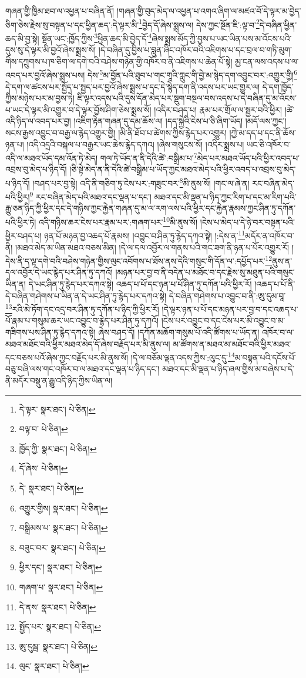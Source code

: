 གཞན་གྱི་ཁྱིམ་ཐབ་ལ་འཕྱན་པ་བཞིན་ནོ། །གཞན་གྱི་བུད་མེད་ལ་འཕྱན་པ་འགའ་ཞིག་ལ་མཛའ་བོ་དེ་ལྟར་མ་བྱེད་ཅིག་ཅེས་རྗེས་སུ་བསྟན་པ་དང་ཕྱིན་ཆད་:དེ་ལྟར་མི་\footnote{དེ་ལྟར་  སྣར་ཐང་།  པེ་ཅིན། }བྱེད་དོ་ཞེས་སྨྲས་ལ། དེས་ཀྱང་སྔོན་ཇི་:ལྟ་བ་\footnote{བལྟ་བ་  པེ་ཅིན། }དེ་བཞིན་ཕྱིན་ཆད་མི་བྱ་སྟེ། སྔོན་ཡང་:ཁྱོད་ཀྱིས་\footnote{ཁྱོད་ཀྱི་  སྣར་ཐང་།  པེ་ཅིན། }ཕྱིན་ཆད་མི་བྱེད་དོ་\footnote{དོ་ཞེས་  པེ་ཅིན། }ཞེས་སྨྲས་མོད་ཀྱི་བྱས་པ་ཡང་ཡིན་པས་མ་འོངས་པའི་དུས་སུ་དེ་ལྟར་མི་བྱའོ་ཞེས་སྨྲས་སོ། །དེ་བཞིན་དུ་བྱིས་པ་བླུན་ཞིང་འཁོར་བའི་འཇིགས་པ་དང་བྲལ་བ་གཏི་མུག་གིས་དཀྲུགས་པ་ཁ་ཅིག་ལ་དགེ་བའི་བཤེས་གཉེན་གྱི་འཁོར་བ་ནི་འཇིགས་པ་ཆེན་པོ་སྟེ། མྱ་ངན་ལས་འདས་པ་ལ་འབད་པར་བྱའོ་ཞེས་སྨྲས་པས། དེས་\footnote{དེ་  སྣར་ཐང་།  པེ་ཅིན། }མ་བྱོན་པའི་ཐུབ་པ་གང་གཱའི་ཀླུང་གི་བྱེ་མ་སྙེད་དག་འབྱུང་བར་:འགྱུར་གྱི།\footnote{འགྱུར་གྱིས།  སྣར་ཐང་།  པེ་ཅིན། } དེ་དག་ལ་ཚངས་པར་སྤྱོད་པ་སྤྱད་པར་བྱའོ་ཞེས་སྨྲས་པ་དང་དེ་སྙེད་དག་ནི་འདས་པར་ཡང་གྱུར་ལ། དེ་དག་ཁྱོད་ཀྱིས་མཉེས་པར་མ་བྱས་ཏེ། ཇི་ལྟར་འདས་པའི་དུས་དོན་མེད་པར་སྡུག་བསྔལ་བས་འདས་པ་དེ་བཞིན་དུ་མ་འོངས་པ་ཡང་དེ་ལྟར་མི་འགྱུར་བ་དེ་ལྟར་བྱོས་ཤིག་ཅེས་སྨྲས་སོ། །འདིར་བཤད་པ། རྣམ་པར་གྲོལ་ལ་སྦྱར་བའི་ཕྱིར། །ཚེ་འདི་ཉིད་ལ་འབད་པར་བྱ། །འཇིག་རྟེན་གཞན་དུ་དམ་ཆོས་ལ། །དད་སྐྱེའི་ངེས་པ་ཅི་ཞིག་ཡོད། །མདོ་ལས་ཀྱང་། སངས་རྒྱས་འབྱུང་བ་བརྒྱ་ལ་རྙེད་འགྱུར་གྱི། །མི་ནི་ཐོབ་པ་ཚེགས་ཀྱིས་རྙེད་པར་འགྱུར། །ཀྱེ་མ་དད་པ་དང་ནི་ཆོས་ཉན་པ། །འདི་འདྲའི་བསྐལ་པ་བརྒྱར་ཡང་ཆེས་རྙེད་དཀའ། །ཞེས་གསུངས་སོ། །འདིར་སྨྲས་པ། ཡང་ཅི་འཁོར་བ་འདི་ལ་མཐའ་ཡོད་དམ་འོན་ཏེ་མེད། གལ་ཏེ་ཡོད་ན་ནི་དེའི་ཚེ་:བསྒྲིམ་པ་\footnote{བསྒྲིམས་པ་  སྣར་ཐང་།  པེ་ཅིན། }མེད་པར་མཐའ་ཡོད་པའི་ཕྱིར་འབད་པ་འབྲས་བུ་མེད་པ་ཉིད་དོ། །ཅི་སྟེ་མེད་ན་ནི་དེའི་ཚེ་བསྒྲིམ་པ་ཡོད་ཀྱང་མཐའ་མེད་པའི་ཕྱིར་འབད་པ་འབྲས་བུ་མེད་པ་ཉིད་དོ། །བཤད་པར་བྱ་སྟེ། འདི་ནི་གཅིག་ཏུ་ངེས་པར་:གཟུང་བར་\footnote{བཟུང་བར་  སྣར་ཐང་།  པེ་ཅིན། }མི་ནུས་སོ། །གང་ལ་ཞེ་ན། རང་བཞིན་མེད་པའི་ཕྱིར།\footnote{ཕྱིར་དང་།  སྣར་ཐང་།  པེ་ཅིན། } རང་བཞིན་མེད་པའི་མཐའ་དང་ལྡན་པ་དང་། མཐའ་དང་མི་ལྡན་པ་ཉིད་ཀྱང་རིག་པ་དང་མ་རིག་པའི་རྒྱུ་ཅན་ཉིད་ཀྱི་ཕྱིར་དང་དེ་གཉིས་ཀྱང་རྐྱེན་གཞན་དུ་མ་ལ་རག་ལས་པའི་ཕྱིར་དང་རྐྱེན་རྣམས་ཀྱང་ཤིན་ཏུ་དཀོན་པའི་ཕྱིར་ཏེ། འདི་གཉིས་ཆར་ངེས་པར་རྣམ་པར་:གཞག་པར་\footnote{གཞག་པ་  སྣར་ཐང་།  པེ་ཅིན། }མི་ནུས་སོ། །ངེས་པ་མེད་པ་དེ་ཉེ་བར་བསྟན་པའི་ཕྱིར་བཤད་པ། ཉན་པོ་མཉན་བྱ་འཆད་པོ་རྣམས། །འབྱུང་བ་ཤིན་ཏུ་རྙེད་དཀའ་སྟེ། །:དེས་ན་\footnote{དེ་ནས་  སྣར་ཐང་།  པེ་ཅིན། }མདོར་ན་འཁོར་བ་ནི། །མཐའ་མེད་མ་ཡིན་མཐའ་བཅས་མིན། །དེ་ལ་དལ་འབྱོར་ལ་གནས་པའི་གང་ཟག་ནི་ཉན་པ་པོར་འགྱུར་རོ། །དེས་ནི་ད་ལྟ་དགེ་བའི་བཤེས་གཉེན་གྱིས་ལུང་འབོགས་པ་ཐོས་ནས་དེའི་གསུང་གི་དོན་ལ་:དཔྱོད་པར་\footnote{སྤྱོད་པར་  སྣར་ཐང་།  པེ་ཅིན། }ནུས་ན་དལ་འབྱོར་དེ་ཡང་རྙེད་པར་ཤིན་ཏུ་དཀའོ། །མཉན་པར་བྱ་བ་ནི་བདེན་པ་མཐོང་བ་དང་རྗེས་སུ་མཐུན་པའི་གསུང་ཡིན་ན། དེ་ཡང་ཤིན་ཏུ་རྙེད་པར་དཀའ་སྟེ། འཆད་པ་པོ་དང་ཉན་པ་པོ་ཤིན་ཏུ་དཀོན་པའི་ཕྱིར་རོ། །འཆད་པ་པོ་ནི་དེ་བཞིན་གཤེགས་པ་ཡིན་ན་དེ་ཡང་ཤིན་ཏུ་རྙེད་པར་དཀའ་སྟེ། དེ་བཞིན་གཤེགས་པ་འབྱུང་བ་ནི་:ཨུ་དུམ་བཱ་\footnote{ཨུ་དུམྦ་  སྣར་ཐང་།  པེ་ཅིན། }རའི་མེ་ཏོག་དང་འདྲ་བར་ཤིན་ཏུ་དཀོན་པ་ཉིད་ཀྱི་ཕྱིར་རོ། །དེ་ལྟར་ཉན་པ་པོ་དང་མཉན་པར་བྱ་བ་དང་འཆད་པ་པོ་རྣམ་པ་གསུམ་ཆར་ཡང་འབྱུང་བ་རྙེད་པར་ཤིན་ཏུ་དཀའོ། །ངེས་པར་འབྱུང་བ་དང་ངེས་པར་མི་འབྱུང་བ་མ་གཟིགས་པས་ཤིན་ཏུ་རྙེད་དཀའ་སྟེ། ཞེས་བཤད་དོ། །དཀོན་མཆོག་གསུམ་པོ་འདི་ཚོགས་པ་ཡོད་ན། འཁོར་བ་ལ་མཐའ་མཐོང་བའི་ཕྱིར་མཐའ་མེད་དོ་ཞེས་བརྗོད་པར་མི་ནུས་ལ། མ་ཚོགས་ན་མཐའ་མ་མཐོང་བའི་ཕྱིར་མཐའ་དང་བཅས་པའོ་ཞེས་ཀྱང་བརྗོད་པར་མི་ནུས་སོ། །དེ་ལ་བཅོམ་ལྡན་འདས་ཀྱིས་:ལུང་དུ་\footnote{ལུང་  སྣར་ཐང་།  པེ་ཅིན། }མ་བསྟན་པའི་དངོས་པོ་བཅུ་བཞི་ལས་གང་འཁོར་བ་ལ་མཐའ་དང་ལྡན་པ་ཉིད་དང་། མཐའ་དང་མི་ལྡན་པ་ཉིད་ཞལ་གྱིས་མ་བཞེས་པ་དེ་ནི་མདོར་བསྡུ་ན་རྒྱུ་འདི་ཉིད་ཀྱིས་ཡིན་ལ། 